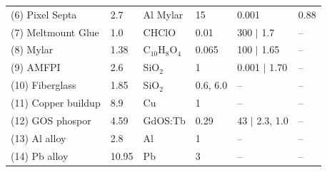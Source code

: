 \begin{table}[]
\begin{tabular}{llllll}
(6) Pixel Septa        & 2.7                                                          & Al Mylar                & 15                                                       & 0.001                                                                           & 0.88         \\
(7) Meltmount Glue     & 1.0                                                          & CHClO & 0.01                                                     & 300 $|$ 1.7                                                                     & --           \\
(8) Mylar              & 1.38                                                         & C$_{10}$H$_8$O$_4$      & 0.065                                                    & 100 $|$ 1.65                                                                    & --           \\
(9) AMFPI              & 2.6                                                          & SiO$_2$                 & 1                                                        & 0.001 $|$ 1.70                                                                  & --           \\
(10) Fiberglass        & 1.85                                                         & SiO$_2$                 & 0.6, 6.0                                                  & --                                                                              & --           \\
(11) Copper buildup    & 8.9                                                          & Cu                      & 1                                                        & --                                                                              & --           \\
(12) GOS phospor       & 4.59                                                         & GdOS:Tb         & 0.29                                                     & 43 $|$ 2.3, 1.0                                                       & --           \\
(13) Al alloy          & 2.8                                                          & Al                      & 1                                                        & --                                                                              & --           \\
(14) Pb alloy          & 10.95                                                        & Pb                      & 3                                                        & --                                                                              & --           \\

\end{tabular}
\end{table}
